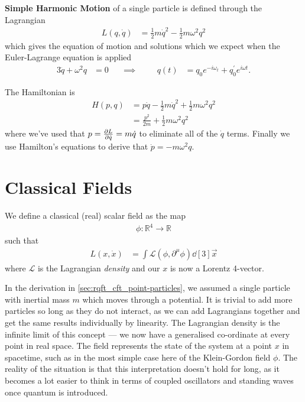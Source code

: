 \documentclass[notes.tex]{subfiles}
\begin{document}
\begin{example}
  \textbf{Simple Harmonic Motion} of a single particle is defined through the Lagrangian
  \begin{align*}
    L(q, \dot{q}) &= \frac{1}{2} m \dot{q}^2 - \frac{1}{2} m \omega^2 q^2
  \end{align*}
  which gives the equation of motion and solutions which we expect when the Euler-Lagrange equation is applied
  \begin{alignat*}{3}
    \ddot{q} + \omega^2 q &= 0 & \quad\implies &\quad& q(t) &= q_0 e^{-i\omega_t} + q_0^\prime e^{i\omega t}.
  \end{alignat*}
  
  The Hamiltonian is
  \begin{align*}
    H(p, q) &= p \dot{q} - \frac{1}{2} m \dot{q}^2 + \frac{1}{2} m \omega^2 q^2\\
    &= \frac{p^2}{2m} + \frac{1}{2} m \omega^2 q^2
  \end{align*}
  where we've used that $p = \pdv{L}{\dot{q}} = m \dot{q}$ to eliminate all of the $\dot{q}$ terms.
  Finally we use Hamilton's equations to derive that $\dot{p} = -m\omega^2 q$. 
\end{example}

\section{Classical Fields}
We define a classical (real) scalar field as the map
\begin{align*}
  \phi : \mathbb{R}^4 \to \mathbb{R}
\end{align*}
such that
\begin{align*}
  L(x, \dot{x}) &= \int \mathcal{L}(\phi, \partial^\mu \phi) \dd[3]{\vec{x}}
\end{align*}
where $\mathcal{L}$ is the Lagrangian \emph{density} and our $x$ is now a Lorentz 4-vector.

\begin{whatmeans}
  In the derivation in \autoref{sec:rqft_cft_point-particles}, we assumed a single particle with inertial mass $m$ which moves through a potential. It is trivial to add more particles so long as they do not interact, as we can add Lagrangians together and get the same results individually by linearity. The Lagrangian density is the infinite limit of this concept --- we now have a generalised co-ordinate at every point in real space. The field represents the state of the system at a point $x$ in spacetime, such as in the most simple case here of the Klein-Gordon field $\phi$. The reality of the situation is that this interpretation doesn't hold for long, as it becomes a lot easier to think in terms of coupled oscillators and standing waves once quantum is introduced.
\end{whatmeans}
\end{document}
